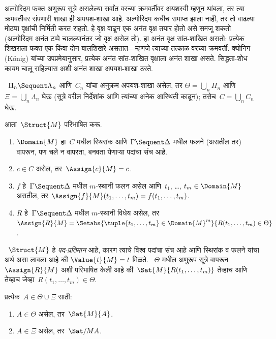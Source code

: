 अल्गोरिदम फक्त अणुरूप सूत्रे असलेल्या
सर्वांत वरच्या क्रमवर्तीवर अयशस्वी म्हणून थांबला, तर त्या
क्रमवर्तीवर संपणारी शाखा ही अपयश-शाखा आहे.
अल्गोरिदम कधीच समाप्त झाला नाही, तर तो वाढत्या
मोठ्या वृक्षांची निर्मिती करत राहतो. हे वृक्ष
वाढून एक अनंत वृक्ष तयार होतो असे समजू शकतो
(अल्गोरिदम अनंत टप्पे चालल्यानंतर जो वृक्ष असेल तो).
हा अनंत वृक्ष सांत-शाखित असतो: प्रत्येक शिखराला
फक्त एक किंवा दोन बालशिखरे असतात---म्हणजे त्याच्या
तत्काळ वरच्या क्रमवर्ती. क्योनिग (K\H{o}nig)
यांच्या उपप्रमेयानुसार,
प्रत्येक अनंत सांत-शाखित वृक्षाला अनंत शाखा असते.
सिद्धता-शोध कायम चालू राहिल्यास अशी अनंत शाखा
अपयश-शाखा ठरते.

~$\Pi_n \Sequent \Lambda_n$ आणि~$C_n$
यांचा अनुक्रम अपयश-शाखा असेल, तर
$\Theta = \bigcup_n \Pi_n$ आणि~$\Xi = \bigcup_n \Lambda_n$
घेऊ (सूत्रे वरील निर्देशांक आणि त्यांच्या
अनेक आस्थिती काढून); तसेच~$C = \bigcup_n C_n$ घेऊ.

आता~$\Struct{M}$ परिभाषित करू.
\begin{enumerate}
\item $\Domain{M}$ हा~$C$ मधील स्थिरांक आणि
$\Gamma \Sequent \Delta$ मधील फलने
(असतील तर) वापरून, पण चले न वापरता,
बनवता येणाऱ्या पदांचा संच आहे.
\item $c \in C$ असेल, तर~$\Assign{c}{M} = c$.
\item $f$ हे~$\Gamma \Sequent \Delta$ मधील
$m$-स्थानी फलन असेल आणि~$t_1$,
\dots, $t_m \in \Domain{M}$ असतील, तर
$\Assign{f}{M}(t_1, \dots, t_m) = f(t_1, \dots, t_m)$.
\item $R$ हे~$\Gamma \Sequent \Delta$ मधील
$m$-स्थानी विधेय असेल, तर
$\Assign{R}{M} = \Setabs{\tuple{t_1, \dots, t_m} \in
\Domain{M}^m}{R(t_1, \dots, t_m) \in \Theta}$.
\end{enumerate}
~$\Struct{M}$ हे \emph{पद-प्रतिमान} आहे, कारण
त्याचे विश्व पदांचा संच आहे आणि स्थिरांक व
फलने यांचा अर्थ असा लावला आहे की
$\Value{t}{M} = t$ मिळते. ~$\Theta$ मधील अणुरूप
सूत्रे वापरून~$\Assign{R}{M}$ अशी परिभाषित
केली आहे की~$\Sat{M}{R(t_1, \dots, t_m)}$ तेव्हाच
आणि तेव्हाच जेव्हा~$R(t_1, \dots, t_m) \in \Theta$.

\begin{lem}\label{pt:ps:cpl:lem:truth}
प्रत्येक~$A \in \Theta \cup \Xi$ साठी:
\begin{enumerate}
  \item $A \in \Theta$ असेल, तर~$\Sat{M}{A}$.
  \item $A \in \Xi$ असेल, तर~$\Sat/{M}{A}$.
\end{enumerate}
\end{lem}

